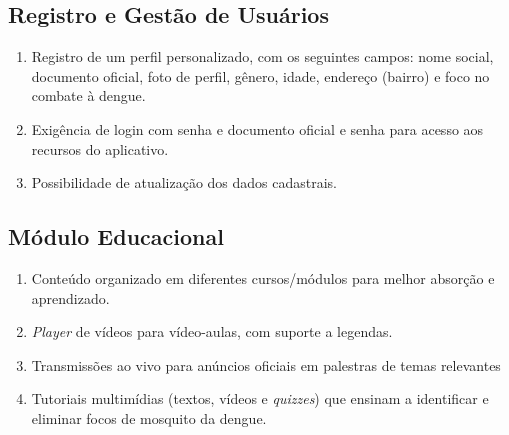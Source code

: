 \documentclass[a5paper, 12pt]{article}
\begin{document}
\subsection{Registro e Gestão de Usuários}
\begin{enumerate}
    \item Registro de um perfil personalizado, com os seguintes campos: nome social, documento oficial, foto de perfil, gênero, idade, endereço (bairro) e foco no combate à dengue.
    \item Exigência de login com senha e documento oficial e senha para acesso aos recursos do aplicativo.
    \item Possibilidade de atualização dos dados cadastrais.
\end{enumerate}

\subsection{Módulo Educacional}
\begin{enumerate}
    \item Conteúdo organizado em diferentes cursos/módulos para melhor absorção e aprendizado.
    \item \textit{Player} de vídeos para vídeo-aulas, com suporte a legendas.
    \item Transmissões ao vivo para anúncios oficiais em palestras de temas relevantes
    \item Tutoriais multimídias (textos, vídeos e \textit{quizzes}) que ensinam a identificar e eliminar focos de mosquito da dengue.
\end{enumerate}
\end{document}
